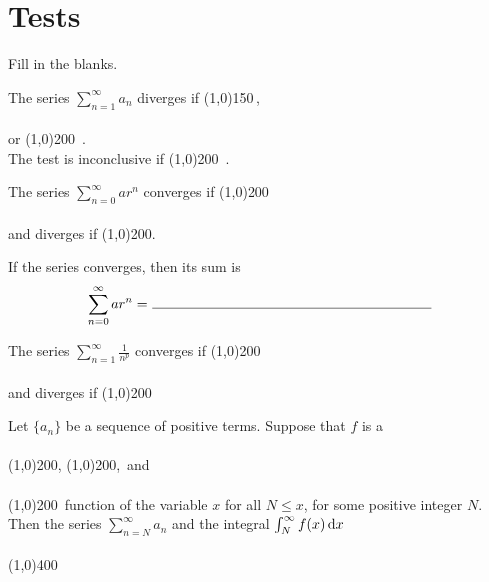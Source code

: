 \documentclass[12pt]{amsart}
\begin{document}
\newpage

\section{Tests}

Fill in the blanks.

\begin{thm}
  The series \(\sum_{n = 1}^\infty a_n\) diverges if \line(1,0){150}\,,\\
  \vspace{0.10in}\\
  or \line(1,0){200}\ .
  \vspace{0.10in}\\
  The test is inconclusive if \line(1,0){200}\ .
\end{thm}

\begin{thm}
  The series \(\sum_{n = 0}^\infty a r^n\) converges if \line(1,0){200}\\
  \vspace{0.10in}\\
  and diverges if \line(1,0){200}.
  
  \noindent If the series converges, then its sum is\\
  \[\sum_{n = 0}^\infty a r^n =\ \line(1,0){200}\]
\end{thm}

\begin{thm}
  The series \(\sum_{n = 1}^\infty \frac{1}{n^p}\) converges if \line(1,0){200}\\
  \vspace{.10in}\\
  and diverges if \line(1,0){200}
\end{thm}

\begin{thm}
  Let \(\{a_n\}\) be a sequence of positive terms.
  Suppose that \(f\) is a\\
  \vspace{.10in}\\
  \line(1,0){200},
  \line(1,0){200},\, and\\
  \vspace{.10in}\\
  \line(1,0){200}\ function of the variable \(x\) for all \(N \leq x\), for some positive integer \(N\).
  Then the series \(\sum_{n = N}^\infty a_n\) and the integral \(\int_N^\infty f(x)\dif x\)\\
  \vspace{.10in}\\
  \line(1,0){400}
\end{thm}
\end{document}
